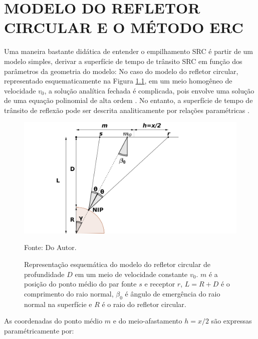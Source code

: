 \chapter{MODELO DO REFLETOR CIRCULAR E O MÉTODO ERC}
\label{cap7}

Uma maneira bastante didática de entender o empilhamento SRC é partir de um modelo simples,
derivar a superfície de tempo de trânsito SRC em função dos
parâmetros da geometria do modelo:
No caso do modelo do refletor circular,  representado esquematicamente na Figura \ref{fig:7.1}, 
em um meio homogêneo de velocidade $v_0$,
a solução analítica fechada é complicada, pois envolve uma solução de uma equação polinomial de
alta ordem \cite{landa}.
No entanto, a superfície de tempo de trânsito de reflexão pode ser descrita analiticamente por relações paramétricas
\cite{glaeser}.

\begin{figure}[htb]
\caption{Representação esquemática do modelo do refletor circular de profundidade $D$
em um meio de velocidade constante $v_0$.
$m$ é a posição do ponto médio do par fonte $s$ e receptor $r$, $L=R+D$ é o comprimento do raio normal, 
$\beta_0$ é ângulo de emergência
do raio normal na superfície e $R$ é o raio do refletor circular.}
\begin{flushleft}
\includegraphics[scale=0.45]{images/circ.png}
\vspace{-0.3cm}
\end{flushleft}
\begin{center}
 Fonte: Do Autor.
\end{center}
\label{fig:7.1}
\end{figure}



As coordenadas do ponto médio $m$ e do meio-afastamento $h=x/2$ 
são expressas paramétricamente por:


